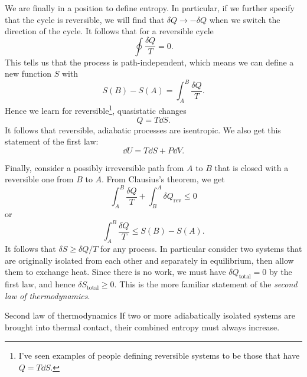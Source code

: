 We are finally in a position to define entropy.
In particular, if we further specify that the cycle is reversible,
we will find that $\delta Q\to-\delta Q$ when we switch the direction of the
cycle. It follows that for a reversible cycle
\begin{equation}
 \oint\frac{\delta Q}{T}=0. 
\end{equation}
This tells us that the process is path-independent, which means we can define a
new function $S$ with
\begin{equation}
 S(B)-S(A)=\int_A^B\frac{\delta Q}{T}. 
\end{equation}
Hence we learn for reversible\footnote{I've seen examples of people defining
reversible systems to be those that have $Q=T\dd S$.}, 
quasistatic changes
\begin{equation}
Q=T\dd S.
\end{equation}
It follows that reversible, adiabatic processes are isentropic.
We also get this statement of the first law:
\begin{equation}
 \dd U = T\dd S+P\dd V.
\end{equation} 

Finally, consider a possibly irreversible path from $A$ to $B$ that is closed
with a reversible one from $B$ to $A$. From Clausius's theorem, we get
\begin{equation}
\int_A^B\frac{\delta Q}{T}+\int_B^A\delta Q_{\text{rev}}\leq0
\end{equation}
or
\begin{equation}
\int_A^B\frac{\delta Q}{T}\leq S(B)-S(A).
\end{equation}
It follows that $\delta S\geq\delta Q/T$ for any process. In particular consider
two systems that are originally isolated from each other and separately in
equilibrium, then allow them to exchange heat. Since there is no work, we must
have $\delta Q_{\text{total}}=0$ by the first law, and hence $\delta
S_{\text{total}}\geq0$. This is the more familiar statement of
the {\it second law of thermodynamics}.
\begin{theorem}{Second law of thermodynamics}{}
If two or more adiabatically isolated systems are brought into thermal contact,
their combined entropy must always increase.
\end{theorem}

